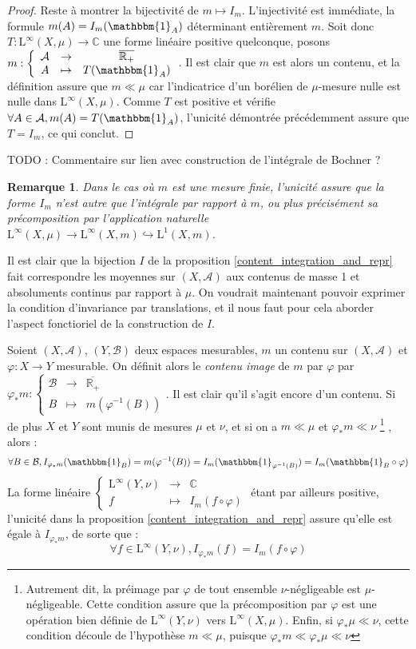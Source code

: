 \documentclass[a4paper,12pt]{article}
\newtheorem{remark}[theorem]{Remarque}
\newcommand{\R}{\mathbb{R}}
\newcommand{\C}{\mathbb{C}}
\newcommand{\indic}{\mathbbm{1}}
\newcommand\fundef[3]{#1: \left\{\begin{array}{ccc}#2\\#3\end{array}\right.}
\newcommand\funlam[2]{\left\{\begin{array}{ccc}#1\\#2\end{array}\right.}
\newcommand{\closure}[1]{\overline{#1}}
\newcommand{\inv}{^{-1}}
\newcommand{\comp}{\circ}
\newcommand{\TODO}[1]{{\color{red}TODO :} #1}
\begin{document}
\begin{proof}
    Reste à montrer la bijectivité de $m\mapsto I_m$. L'injectivité est immédiate, la formule $m(A) = I_m(\indic_A)$ déterminant
    entièrement $m$. Soit donc $T : \mathrm{L}^\infty(X, \mu)\to\C$ une forme linéaire positive quelconque, posons $\fundef{m}{\mathcal{A}&\to&\closure{\R_+}}{A&\mapsto&T(\indic_A)}$.
    Il est clair que $m$ est alors un contenu, et la définition assure que $m\ll\mu$ car l'indicatrice d'un borélien de $\mu$-mesure nulle 
    est nulle dans $\mathrm{L}^\infty(X,\mu)$. Comme $T$ est positive et vérifie $\forall A\in\mathcal{A}, m(A)=T(\indic_A)$, l'unicité 
    démontrée précédemment assure que $T = I_m$, ce qui conclut.
\end{proof}

\TODO{Commentaire sur lien avec construction de l'intégrale de Bochner ?}

\begin{remark}
    Dans le cas où $m$ est une mesure finie, l'unicité assure que la forme $I_m$ n'est autre que l'intégrale par rapport à $m$, ou plus précisément sa précomposition
    par l'application naturelle $\mathrm{L}^\infty(X, \mu)\to\mathrm{L}^\infty(X, m)\hookrightarrow\mathrm{L}^1(X, m)$.
\end{remark}

Il est clair que la bijection $I$ de la proposition \ref{content_integration_and_repr} fait correspondre les moyennes 
sur $(X, \mathcal{A})$ aux contenus de masse 1 et absoluments continus par rapport à $\mu$. On voudrait maintenant pouvoir exprimer 
la condition d'invariance par translations, et il nous faut pour cela aborder l'aspect fonctioriel de la construction de $I$.

Soient $(X, \mathcal{A})$, $(Y, \mathcal{B})$ deux espaces mesurables, $m$ un contenu sur $(X, \mathcal{A})$ et $\varphi : X\to Y$ mesurable.
On définit alors le \emph{contenu image} de $m$ par $\varphi$ par $\fundef{\varphi_* m}{\mathcal{B}&\to&\closure{\R_+}}{B&\mapsto&m(\varphi\inv(B))}$.
Il est clair qu'il s'agit encore d'un contenu. Si de plus $X$ et $Y$ sont munis de mesures $\mu$ et $\nu$, et si on a 
$m\ll\mu$ et $\varphi_*m\ll\nu$
\footnote{Autrement dit, la préimage par $\varphi$ de tout ensemble $\nu$-négligeable est $\mu$-négligeable. Cette condition assure que la précomposition 
par $\varphi$ est une opération bien définie de $\mathrm{L}^\infty(Y, \nu)$ vers $\mathrm{L}^\infty(X, \mu)$. Enfin, si $\varphi_*\mu\ll\nu$, cette condition découle de l'hypothèse $m\ll\mu$, 
puisque $\varphi_*m\ll \varphi_*\mu\ll\nu$}
, alors :
\begin{equation*}
    \forall B\in\mathcal{B}, I_{\varphi_*m}(\indic_B) = m(\varphi\inv(B)) = I_m(\indic_{\varphi\inv(B)}) = I_m(\indic_B\comp \varphi)
\end{equation*}
La forme linéaire $\funlam{\mathrm{L}^\infty(Y, \nu)&\to&\C}{f&\mapsto&I_m(f\comp\varphi)}$ étant par ailleurs positive, l'unicité dans la proposition
\ref{content_integration_and_repr} assure qu'elle est égale à $I_{\varphi_*m}$, de sorte que :
\begin{equation*}
    \forall f\in\mathrm{L}^\infty(Y, \nu), I_{\varphi_*m}(f) = I_m(f\comp\varphi)
\end{equation*}
\end{document}
